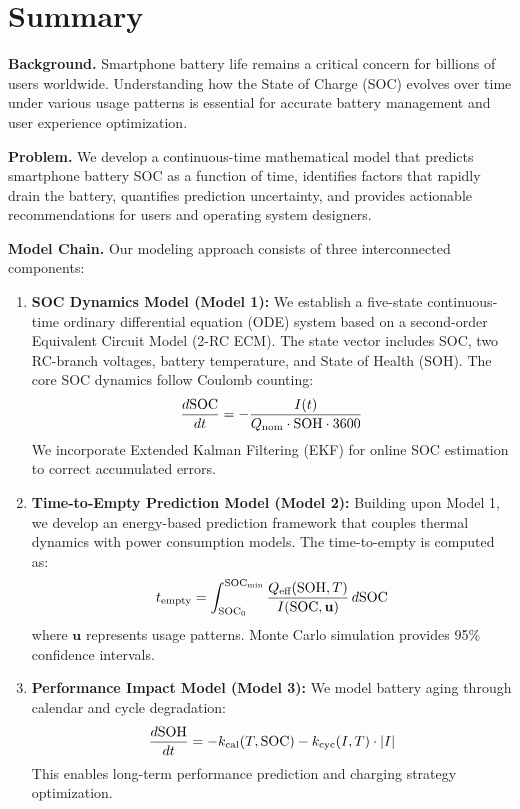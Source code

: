 \section*{Summary}

\textbf{Background.} Smartphone battery life remains a critical concern for billions of users worldwide. Understanding how the State of Charge (SOC) evolves over time under various usage patterns is essential for accurate battery management and user experience optimization.

\textbf{Problem.} We develop a continuous-time mathematical model that predicts smartphone battery SOC as a function of time, identifies factors that rapidly drain the battery, quantifies prediction uncertainty, and provides actionable recommendations for users and operating system designers.

\textbf{Model Chain.} Our modeling approach consists of three interconnected components:

\begin{enumerate}[leftmargin=*]
    \item \textbf{SOC Dynamics Model (Model 1):} We establish a five-state continuous-time ordinary differential equation (ODE) system based on a second-order Equivalent Circuit Model (2-RC ECM). The state vector includes SOC, two RC-branch voltages, battery temperature, and State of Health (SOH). The core SOC dynamics follow Coulomb counting:
    \begin{equation*}
        \frac{d\text{SOC}}{dt} = -\frac{I(t)}{Q_{\text{nom}} \cdot \text{SOH} \cdot 3600}
    \end{equation*}
    We incorporate Extended Kalman Filtering (EKF) for online SOC estimation to correct accumulated errors.
    
    \item \textbf{Time-to-Empty Prediction Model (Model 2):} Building upon Model 1, we develop an energy-based prediction framework that couples thermal dynamics with power consumption models. The time-to-empty is computed as:
    \begin{equation*}
        t_{\text{empty}} = \int_{\text{SOC}_0}^{\text{SOC}_{\min}} \frac{Q_{\text{eff}}(\text{SOH}, T)}{I(\text{SOC}, \mathbf{u})} \, d\text{SOC}
    \end{equation*}
    where $\mathbf{u}$ represents usage patterns. Monte Carlo simulation provides 95\% confidence intervals.
    
    \item \textbf{Performance Impact Model (Model 3):} We model battery aging through calendar and cycle degradation:
    \begin{equation*}
        \frac{d\text{SOH}}{dt} = -k_{\text{cal}}(T, \text{SOC}) - k_{\text{cyc}}(I, T) \cdot |I|
    \end{equation*}
    This enables long-term performance prediction and charging strategy optimization.
\end{enumerate}

